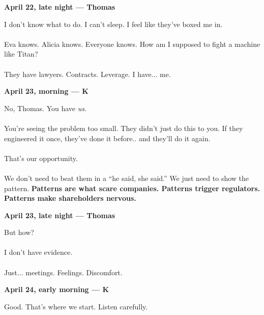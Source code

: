 \begin{JournalChat}

\textbf{April 22, late night — Thomas} 
\begin{adjustwidth}{2em}{}
    I don’t know what to do. I can’t sleep.  
    I feel like they’ve boxed me in.  
    \\\\
    Eva knows. Alicia knows. Everyone knows.  
    How am I supposed to fight a machine like Titan?  
    \\\\
    They have lawyers. Contracts. Leverage.  
    I have... me.
\end{adjustwidth}

\vspace{1em}

\textbf{April 23, morning — K} 
\begin{adjustwidth}{2em}{}
    No, Thomas.  
    You have \textit{us}.  
    \\\\
    You’re seeing the problem too small.  
    They didn’t just do this to you.  
    If they engineered it once, they’ve done it before.. and they’ll do it again.  
    \\\\
    That's our opportunity.
    \\\\
    We don’t need to beat them in a “he said, she said.”  
    We just need to show the pattern.  
    \textbf{Patterns are what scare companies. Patterns trigger regulators. Patterns make shareholders nervous.}
\end{adjustwidth}

\vspace{1em}

\textbf{April 23, late night — Thomas} 

\begin{adjustwidth}{2em}{}
    But how?  
    \\\\
    I don’t have evidence.  
    \\\\
    Just... meetings. Feelings. Discomfort.
\end{adjustwidth}

\vspace{1em}

\textbf{April 24, early morning — K} 
\begin{adjustwidth}{2em}{}
    Good. That’s where we start.  
    Listen carefully.


\end{adjustwidth}
\end{JournalChat}
